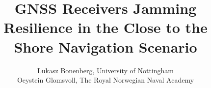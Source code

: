

\usepackage{booktabs}
\usepackage[scale=2]{ccicons}
\usepackage{pgfplots}
\usepackage[font={small,it}]{caption}
\usepackage{subcaption} %



\renewcommand{\footnotesize}{\scriptsize} %


\title[ION]{GNSS Receivers Jamming Resilience in the Close to the Shore Navigation Scenario}

\author{Lukasz Bonenberg, University of Nottingham\\Oeystein Glomsvoll, The Royal Norwegian Naval Academy}
\date{}

